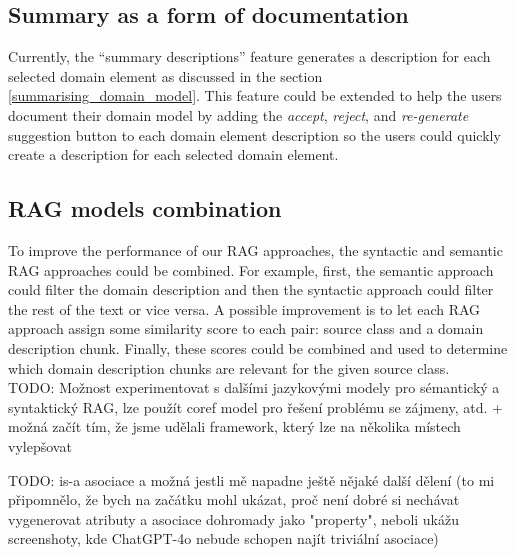 \subsection{Summary as a form of documentation}

Currently, the ``summary descriptions'' feature generates a description for each selected domain element as discussed in the section \ref{summarising_domain_model}. This feature could be extended to help the users document their domain model by adding the \textit{accept}, \textit{reject}, and \textit{re-generate} suggestion button to each domain element description so the users could quickly create a description for each selected domain element.


\subsection{RAG models combination}

To improve the performance of our RAG approaches, the syntactic and semantic RAG approaches could be combined. For example, first, the semantic approach could filter the domain description and then the syntactic approach could filter the rest of the text or vice versa. A possible improvement is to let each RAG approach assign some similarity score to each pair: source class and a domain description chunk. Finally, these scores could be combined and used to determine which domain description chunks are relevant for the given source class. \\

\noindent{}TODO: Možnost experimentovat s dalšími jazykovými modely pro sémantický a syntaktický RAG, lze použít coref model pro řešení problému se zájmeny, atd. + možná začít tím, že jsme udělali framework, který lze na několika místech vylepšovat

\noindent{}TODO: is-a asociace a možná jestli mě napadne ještě nějaké další dělení (to mi připomnělo, že bych na začátku mohl ukázat, proč není dobré si nechávat vygenerovat atributy a asociace dohromady jako "property", neboli ukážu screenshoty, kde ChatGPT-4o nebude schopen najít triviální asociace)